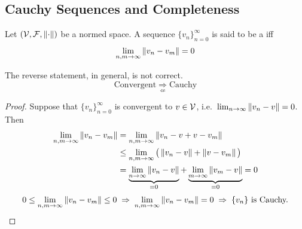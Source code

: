 \subsection{Cauchy Sequences and Completeness}\label{ss:cauchy}
\begin{definition}
Let $(\mathcal{V},\mathcal{F},\left\lVert \cdot \right\rVert)$ be a normed space. A sequence $\{v_n\}_{n=0}^\infty$ is said to be a  iff
\[
\lim_{n,m\to\infty}\left\lVert v_n - v_m \right\rVert = 0
\]
\end{definition}
\begin{claim}
 The reverse statement, in general, is not correct.
\[
\text{Convergent} \;\underset{\not\Leftarrow}{\Rightarrow}\; \text{Cauchy}
\]
\end{claim}
\begin{proof}
Suppose that $\{v_n\}_{n=0}^\infty$ is convergent to $v\in\mathcal{V}$, i.e.\ $\lim_{n\to\infty}\left\lVert v_n - v \right\rVert = 0$. Then
\begin{align*}
\lim_{n,m\to\infty}\left\lVert v_n - v_m \right\rVert &= \lim_{n,m\to\infty}\left\lVert v_n - v + v - v_m \right\rVert\\
&\le \lim_{n,m\to\infty} \big(\left\lVert v_n - v \right\rVert + \left\lVert v - v_m \right\rVert\big)\\
&= \underbrace{\lim_{n\to\infty}\left\lVert v_n - v \right\rVert}_{=0} + \underbrace{\lim_{m\to\infty}\left\lVert v_m - v \right\rVert}_{=0} = 0
\end{align*}
\[
0 \le \lim_{n,m\to\infty}\left\lVert v_n - v_m \right\rVert \le 0 \;\Rightarrow\; \lim_{n,m\to\infty}\left\lVert v_n - v_m \right\rVert = 0 \;\Rightarrow\; \{v_n\} \text{ is Cauchy.}
\qedhere
\]
\end{proof}

